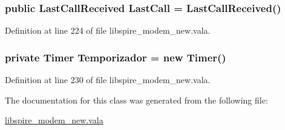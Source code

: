 \hypertarget{classedwinspire_1_1_ports_1_1_modem_a51fe812b8647e75a7abdaa1a92a1fc33}{
\subsubsection[{Last\-Call}]{\setlength{\rightskip}{0pt plus 5cm}public {\bf Last\-Call\-Received} Last\-Call = {\bf Last\-Call\-Received}()\hspace{0.3cm}{\ttfamily [private]}}}\label{classedwinspire_1_1_ports_1_1_modem_a51fe812b8647e75a7abdaa1a92a1fc33}


Definition at line 224 of file libspire\-\_\-modem\-\_\-new.\-vala.

\hypertarget{classedwinspire_1_1_ports_1_1_modem_a672fd977f0bd674d33413c6ccbd30bbc}{
\subsubsection[{Temporizador}]{\setlength{\rightskip}{0pt plus 5cm}private Timer Temporizador = new Timer()\hspace{0.3cm}{\ttfamily [private]}}}\label{classedwinspire_1_1_ports_1_1_modem_a672fd977f0bd674d33413c6ccbd30bbc}


Definition at line 230 of file libspire\-\_\-modem\-\_\-new.\-vala.



The documentation for this class was generated from the following file\-:\begin{DoxyCompactItemize}
\item 
\hyperlink{libspire__modem__new_8vala}{libspire\-\_\-modem\-\_\-new.\-vala}\end{DoxyCompactItemize}

